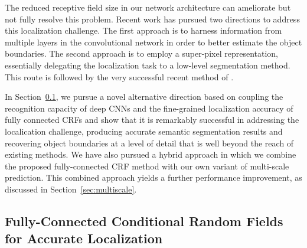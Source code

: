 The reduced receptive field size in our network architecture can ameliorate
but not fully resolve this problem. Recent work has pursued two directions to
address this localization challenge. The first approach is to harness
information from multiple layers in the convolutional network in order to
better estimate the object boundaries. The second approach is
to employ a super-pixel representation, essentially delegating the
localization task to a low-level segmentation method. This route is followed
by the very successful recent method of \cite{mostajabi2014feedforward}.

In Section~\ref{sec:dense-crf}, we pursue a novel alternative direction based
on coupling the recognition capacity of deep CNNs and the fine-grained
localization accuracy of fully connected CRFs and show that it is remarkably
successful in addressing the localication challenge, producing accurate
semantic segmentation results and recovering object boundaries at a level of
detail that is well beyond the reach of existing methods.  We have also
pursued a hybrid approach in which we combine the proposed fully-connected CRF
method with our own variant of multi-scale prediction. This combined approach
yields a further performance improvement, as discussed in
Section~\ref{sec:multiscale}.

\subsection{Fully-Connected Conditional Random Fields for Accurate Localization}
\label{sec:dense-crf}


